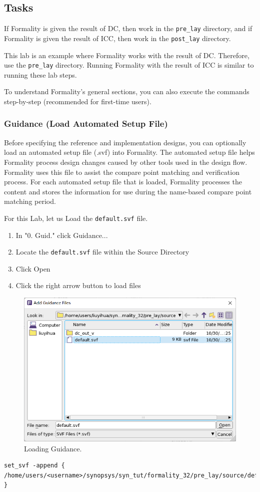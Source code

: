 \documentclass[a4paper,12pt,twoside]{article}
\begin{document}
\subsection{Tasks}
If Formality is given the result of DC, then work in the \texttt{pre\_lay} directory, and if Formality is given the result of ICC, then work in the \texttt{post\_lay} directory.

This lab is an example where Formality works with the result of DC. Therefore, use the \texttt{pre\_lay} directory. Running Formality with the result of ICC is similar to running these lab steps.

To understand Formality's general sections, you can also execute the commands step-by-step (recommended for first-time users).
\subsubsection{Guidance (Load Automated Setup File)}
Before specifying the reference and implementation designs, you can optionally load an automated setup file (.svf) into Formality. The automated setup file helps Formality process design changes caused by other tools used in the design flow. Formality uses this file to assist the compare point matching and verification process. For each automated setup file that is loaded, Formality processes the content and stores the information for use during the name-based compare point matching period.

For this Lab, let us Load the \texttt{default.svf} file.
\begin{enumerate}
    \item In "0. Guid." click Guidance...
    \item Locate the \texttt{default.svf} file within the Source Directory
    \item Click Open
    \item Click the right arrow button to load files
\end{enumerate}
\begin{figure}[H]
    \centering
    \includegraphics[width=\textwidth]{images/41.png}
    \caption{Loading Guidance.}
\end{figure}
\begin{verbatim}
set_svf -append { /home/users/<username>/synopsys/syn_tut/formality_32/pre_lay/source/default.svf }
\end{verbatim}
\end{document}
